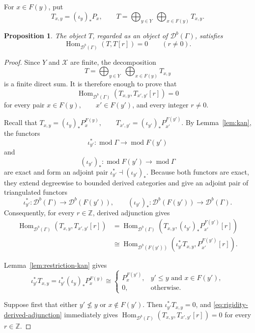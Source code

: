 \documentclass[12pt,a4paper,english,reqno]{amsart}
\theoremstyle{plain}
\newtheorem{proposition}[theorem]{Proposition}
\theoremstyle{definition}
\newcommand{\Hom}{\operatorname{Hom}}
\newcommand{\X}{\mathcal X}
\newcommand{\G}{\Gamma}
\newcommand{\modu}{\operatorname{mod}}
\newcommand{\Db}[1]{{\mathscr D}^b(#1)}
\begin{document}
For $x\in F(y)$, put
\begin{equation}
 T_{x,y}=(\iota_y)_*P_x,\qquad
 T=\bigoplus_{y\in Y}\ \bigoplus_{x\in F(y)}T_{x,y}.
\label{eq:T-relative}
\end{equation}

\begin{proposition}
\label{prop:T-rigid}
The object $T$, regarded as an object of $\Db{\G}$, satisfies
\[
 \Hom_{\Db{\G}}(T,T[r])=0\qquad(r\neq0).
\]
\end{proposition}

\begin{proof}
Since $Y$ and $\X$ are finite, the decomposition
\[
T=
\bigoplus_{y\in Y}\;
\bigoplus_{x\in F(y)}T_{x,y}
\]
is a finite direct sum. It is therefore enough to prove that
\[
\Hom_{\Db{\G}}(T_{x,y},T_{x',y'}[r])=0
\]
for every pair $x\in F(y),\qquad x'\in F(y')$,
and every integer $r\neq0$.

Recall that $T_{x,y}=(\iota_y)_*P_x^{F(y)},
\qquad
T_{x',y'}=(\iota_{y'})_*P_{x'}^{F(y')}$.
By Lemma~\ref{lem:kan}, the functors
\[
\iota_{y'}^*:\modu\G\longrightarrow\modu F(y')
\]
and
\[
(\iota_{y'})_*:\modu F(y')\longrightarrow\modu\G
\]
are exact and form an adjoint pair $\iota_{y'}^*\dashv(\iota_{y'})_*$.
Because both functors are exact, they extend degreewise to bounded
derived categories and give an adjoint pair of triangulated functors
\[
\iota_{y'}^*:\Db{\G}\longrightarrow\Db{F(y')},
\qquad
(\iota_{y'})_*:\Db{F(y')}\longrightarrow\Db{\G}.
\]
Consequently, for every $r\in\mathbb Z$, derived adjunction gives
\begin{align}
\Hom_{\Db{\G}}(T_{x,y},T_{x',y'}[r])
&=
\Hom_{\Db{\G}}(T_{x,y},(\iota_{y'})_*P_{x'}^{F(y')}[r])
\nonumber\\
&\cong
\Hom_{\Db{F(y')}}(\iota_{y'}^*T_{x,y},P_{x'}^{F(y')}[r]).
\label{eq:rigidity-derived-adjunction}
\end{align}

Lemma~\ref{lem:restriction-kan} gives
\[
\iota_{y'}^*T_{x,y}
=
\iota_{y'}^*(\iota_y)_*P_x^{F(y)}
\cong
\begin{cases}
P_x^{F(y')},
  & y'\leq y\text{ and }x\in F(y'),\\
0,
  & \text{otherwise}.
\end{cases}
\]

Suppose first that either $y'\nleq y$ or $x\notin F(y')$. Then $\iota_{y'}^*T_{x,y}=0$,
and \eqref{eq:rigidity-derived-adjunction} immediately gives $\Hom_{\Db{\G}}(T_{x,y},T_{x',y'}[r])=0$
for every $r\in\mathbb Z$.


\end{proof}
\end{document}
